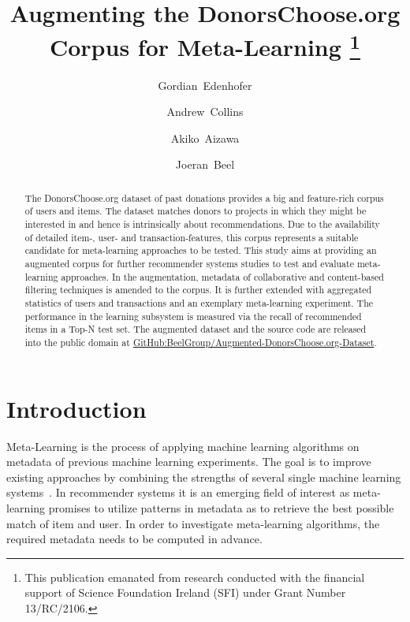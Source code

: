 \documentclass[runningheads]{llncs}
\begin{document}
\title{Augmenting the DonorsChoose.org Corpus for Meta-Learning%
	\thanks{This publication emanated from research conducted with the financial support of Science Foundation Ireland (SFI) under Grant Number 13/RC/2106.}}
\author{Gordian~Edenhofer \and Andrew~Collins \and Akiko~Aizawa \and Joeran~Beel}

\maketitle  %
\markboth{}{}  %

\begin{abstract}
The DonorsChoose.org dataset of past donations provides a big and feature-rich corpus of users and items. The dataset matches donors to projects in which they might be interested in and hence is intrinsically about recommendations. Due to the availability of detailed item-, user- and transaction-features, this corpus represents a suitable candidate for meta-learning approaches to be tested. This study aims at providing an augmented corpus for further recommender systems studies to test and evaluate meta-learning approaches. In the augmentation, metadata of collaborative and content-based filtering techniques is amended to the corpus. It is further extended with aggregated statistics of users and transactions and an exemplary meta-learning experiment. The performance in the learning subsystem is measured via the recall of recommended items in a Top-N test set. The augmented dataset and the source code are released into the public domain at \href{https://github.com/BeelGroup/Augmented-DonorsChoose.org-Dataset}{GitHub:BeelGroup/Augmented-DonorsChoose.org-Dataset}.

\end{abstract}

\section{Introduction}
Meta-Learning is the process of applying machine learning algorithms on metadata of previous machine learning experiments. The goal is to improve existing approaches by combining the strengths of several single machine learning systems~\cite{AIR:MetalearningSurveyOfTrendsAndTechnologiesLemke2015}. In recommender systems it is an emerging field of interest as meta-learning promises to utilize patterns in metadata as to retrieve the best possible match of item and user. In order to investigate meta-learning algorithms, the required metadata needs to be computed in advance.
\end{document}
